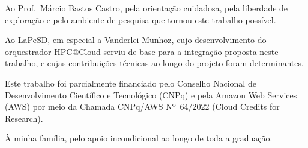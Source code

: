 
\imprimircapa%
\imprimirfolhaderosto*
{}%
\imprimirfolhadecertificacao




\begin{agradecimentos}
Ao Prof.\ Márcio Bastos Castro, pela orientação cuidadosa, pela liberdade de
exploração e pelo ambiente de pesquisa que tornou este trabalho possível.

Ao LaPeSD, em especial a Vanderlei Munhoz, cujo desenvolvimento do orquestrador
HPC@Cloud serviu de base para a integração proposta neste trabalho, e cujas
contribuições técnicas ao longo do projeto foram determinantes.

Este trabalho foi parcialmente financiado pelo Conselho Nacional de
Desenvolvimento Científico e Tecnológico (CNPq) e pela Amazon Web Services
(AWS) por meio da Chamada CNPq/AWS Nº~64/2022 (Cloud Credits for Research).

À minha família, pelo apoio incondicional ao longo de toda a graduação.
\end{agradecimentos}




